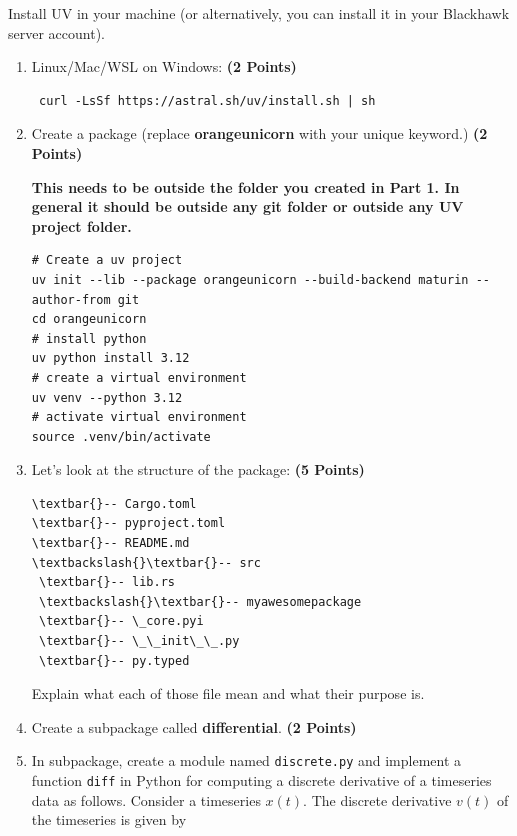 \documentclass[12pt, xcolor=dvipsnames,svgnames,x11names]{article}
\begin{document}
Install UV in your machine (or alternatively, you can install it in your Blackhawk server account).
\begin{enumerate}
   \item Linux/Mac/WSL on Windows: \hfill \textbf{(2 Points)}
   \begin{verbatim}
 curl -LsSf https://astral.sh/uv/install.sh | sh
   \end{verbatim}

   \item Create a package (replace \textbf{orangeunicorn} with your unique keyword.) \hfill \textbf{(2 Points)}

\textbf{This needs to be outside the folder you created in Part 1. In general it should be outside any git folder or outside any UV project folder.}   
   
   \begin{verbatim}
# Create a uv project
uv init --lib --package orangeunicorn --build-backend maturin --author-from git
cd orangeunicorn
# install python
uv python install 3.12
# create a virtual environment
uv venv --python 3.12
# activate virtual environment
source .venv/bin/activate
\end{verbatim}

\item Let's look at the structure of the package: \hfill \textbf{(5 Points)}

\begin{Verbatim}[commandchars=\\\{\}]
\textbar{}-- Cargo.toml
\textbar{}-- pyproject.toml
\textbar{}-- README.md
\textbackslash{}\textbar{}-- src
 \textbar{}-- lib.rs
 \textbackslash{}\textbar{}-- myawesomepackage
 \textbar{}-- \_core.pyi
 \textbar{}-- \_\_init\_\_.py
 \textbar{}-- py.typed
\end{Verbatim}

Explain what each of those file mean and what their purpose is.

\item Create a subpackage called \textbf{differential}. \hfill \textbf{(2 Points)}
\item In subpackage, create a module named \texttt{discrete.py} and implement a function \texttt{diff} in Python for computing a discrete derivative of a timeseries data as follows. Consider a timeseries $x(t)$. The discrete derivative $v(t)$ of the timeseries is given by 


\end{enumerate}
\end{document}
